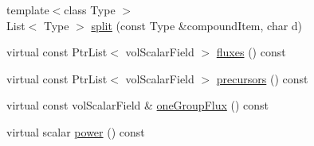 \begin{DoxyCompactItemize}
\item 
{\footnotesize template$<$class Type $>$ }\\List$<$ Type $>$ \hyperlink{classFoam_1_1pointKineticNeutronics_a17df28194ecd3c8c61db6cc580694343}{split} (const Type \&compound\+Item, char d)
\item 
virtual const Ptr\+List$<$ vol\+Scalar\+Field $>$ \hyperlink{classFoam_1_1pointKineticNeutronics_abf64af4a1378deee4038292ef2bed74e}{fluxes} () const
\item 
virtual const Ptr\+List$<$ vol\+Scalar\+Field $>$ \hyperlink{classFoam_1_1pointKineticNeutronics_adff280398fa801b37b673a30623f5afe}{precursors} () const
\item 
virtual const vol\+Scalar\+Field \& \hyperlink{classFoam_1_1pointKineticNeutronics_a67faa978ebf3e97a9df21f1e37a68a8d}{one\+Group\+Flux} () const
\item 
virtual scalar \hyperlink{classFoam_1_1pointKineticNeutronics_a96a4e39548be52ca563c1e5b7dd885b8}{power} () const
\end{DoxyCompactItemize}
